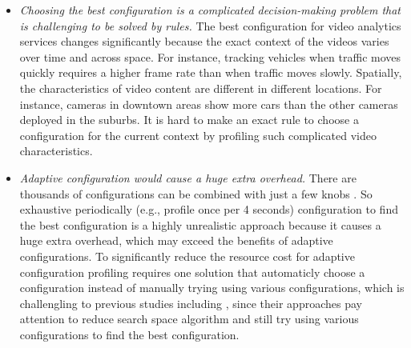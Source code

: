 \begin{itemize}	
	\item \emph{Choosing the best configuration is a complicated decision-making problem that is challenging to be solved by rules.} The best configuration for video analytics services changes significantly because the exact context of the videos varies over time and across space. For instance, tracking vehicles when traffic moves quickly requires a higher frame rate than when traffic moves slowly. Spatially, the characteristics of video content are different in different locations. For instance, cameras in downtown areas show more cars than the other cameras deployed in the suburbs. It is hard to make an exact rule to choose a configuration for the current context by profiling such complicated video characteristics.
	
	\item \emph{Adaptive configuration would cause a huge extra overhead.} %
	There are thousands of configurations can be combined with just a few knobs \cite{jiang2018chameleon}. So exhaustive periodically (e.g., profile once per 4 seconds) configuration to find the best configuration is a highly unrealistic approach because it causes a huge extra overhead, which may exceed the benefits of adaptive configurations. To significantly reduce the resource cost for adaptive configuration profiling requires one solution that automaticly choose a configuration instead of manually trying using various configurations, which is challengling to previous studies including \cite{wang2020jcab,jiang2018chameleon}, since their approaches pay attention to reduce search space algorithm and still try using various configurations to find the best configuration. 
	
	
\end{itemize}

